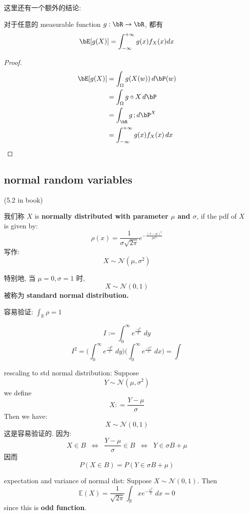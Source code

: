 这里还有一个额外的结论:
\begin{proposition}
     对于任意的 measurable function \(g: \bR \to \bR\), 都有
\[
\bE[g(X)] = \int_{-\infty}^{+\infty} g(x) f_X(x) dx
\]
\end{proposition}
\begin{proof}
\begin{align*}
\bE[g(X)] &= \int_{\Omega} g(X(w))\, d\bP(w) \\
&=  \int_{\Omega} g\circ X \, d\bP \\
&= \int_{\bR} g \, ;d\bP^X \\
&= \int_{-\infty}^{+\infty} g(x) f_X(x) \, dx
\end{align*}
\end{proof}


\subsection{normal random variables}
(5.2 in book)
\begin{definition}
我们称 $X$ is \textbf{normally distributed with parameter $\mu$ and $\sigma$}, if the pdf of $X$ is given by: \[
\rho(x) = \frac{1}{\sigma \sqrt{2\pi}} e^{-\frac{(x - \mu)^2}{2 \sigma ^2}}
\]
写作: \[
X \sim \mathcal{N}(\mu, \sigma^2)
\]
\end{definition}
特别地, 当 $\mu =0, \sigma = 1$ 时, \[
X \sim \mathcal{N}(0, 1)
\]被称为 \textbf{standard normal distribution.}


容易验证: \(\int_{\mathbb{R}} \rho  = 1 \)

\[
I := \int_ 0^\infty e^{\frac{-y^2}{2}} \; dy
\]
\[
I^2 = \Bigg(\int_ 0^\infty e^{\frac{-y^2}{2}} \; dy\Bigg)\Bigg(\int_ 0^\infty e^{\frac{-x^2}{2}} \; dx\Bigg) = \int
\]






rescaling to std normal distribution: 
Suppose \[
Y \sim \mathcal{N}(\mu, \sigma^2)
\] we define \[
X : = \frac{Y - \mu}{\sigma}
\]
Then we have: \[
X \sim \mathcal{N}(0,1)
\]
这是容易验证的. 因为: \[
X \in B \;\; \Longleftrightarrow  \;\; \frac{Y-\mu}{\sigma} \in B \;\; \Longleftrightarrow  \;\; Y \in \sigma B + \mu
\]
因而 \[
P(X \in B ) = P(Y \in \sigma B + \mu)
\]






expectation and variance of normal dist:
Suppose $ X \sim \mathcal{N}(0,1)$. Then \[
\mathbb{E}(X) =  \frac{1}{\sqrt{2\pi }} \int _{\mathbb{R}} x   e^{-\frac{x^2}{2}}    \; dx   = 0
\]
since this is \textbf{odd function}.

